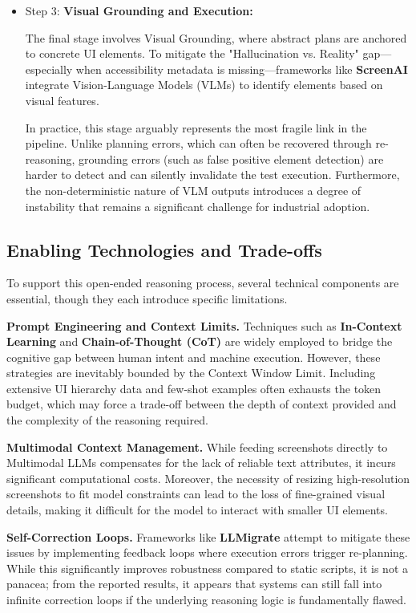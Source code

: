 \documentclass[acmsmall,nonacm]{acmart}
\begin{document}
\begin{itemize}
    \item Step 3: \textbf{Visual Grounding and Execution: }
    
    The final stage involves Visual Grounding, where abstract plans are anchored to concrete UI elements. To mitigate the "Hallucination vs. Reality" gap—especially when accessibility metadata is missing—frameworks like \textbf{ScreenAI} \cite{baechler2024screenaivisionlanguagemodelui} integrate Vision-Language Models (VLMs) to identify elements based on visual features.
    
    In practice, this stage arguably represents the most fragile link in the pipeline. Unlike planning errors, which can often be recovered through re-reasoning, grounding errors (such as false positive element detection) are harder to detect and can silently invalidate the test execution. Furthermore, the non-deterministic nature of VLM outputs introduces a degree of instability that remains a significant challenge for industrial adoption.
\end{itemize}

\subsection{Enabling Technologies and Trade-offs}
To support this open-ended reasoning process, several technical components are essential, though they each introduce specific limitations.

\textbf{Prompt Engineering and Context Limits.} Techniques such as \textbf{In-Context Learning} and \textbf{Chain-of-Thought (CoT)} \cite{wei2023chainofthoughtpromptingelicitsreasoning} are widely employed to bridge the cognitive gap between human intent and machine execution. However, these strategies are inevitably bounded by the Context Window Limit. Including extensive UI hierarchy data and few-shot examples often exhausts the token budget, which may force a trade-off between the depth of context provided and the complexity of the reasoning required.

\textbf{Multimodal Context Management.} While feeding screenshots directly to Multimodal LLMs compensates for the lack of reliable text attributes, it incurs significant computational costs. Moreover, the necessity of resizing high-resolution screenshots to fit model constraints can lead to the loss of fine-grained visual details, making it difficult for the model to interact with smaller UI elements.

\textbf{Self-Correction Loops.} Frameworks like \textbf{LLMigrate} \cite{10.1145/3728975} attempt to mitigate these issues by implementing feedback loops where execution errors trigger re-planning. While this significantly improves robustness compared to static scripts, it is not a panacea; from the reported results, it appears that systems can still fall into infinite correction loops if the underlying reasoning logic is fundamentally flawed.
\end{document}
